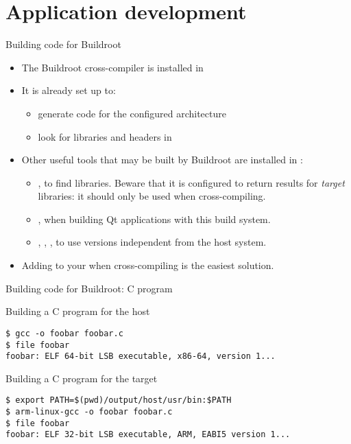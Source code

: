 
\section{Application development}

\begin{frame}{Building code for Buildroot}
  \begin{itemize}
  \item The Buildroot cross-compiler is installed in
  \item It is already set up to:
    \begin{itemize}
    \item generate code for the configured architecture
    \item look for libraries and headers in 
    \end{itemize}
  \item Other useful tools that may be built by Buildroot are
    installed in :
    \begin{itemize}
    \item {}, to find libraries. Beware that it is
      configured to return results for {\em target} libraries: it
      should only be used when cross-compiling.
    \item {}, when building Qt applications with this build
      system.
    \item {}, , , to use
      versions independent from the host system.
    \end{itemize}
  \item Adding  to your  when
    cross-compiling is the easiest solution.
  \end{itemize}
\end{frame}

\begin{frame}[fragile]{Building code for Buildroot: C program}

\begin{block}{Building a C program for the host}
{\small
  \begin{verbatim}
$ gcc -o foobar foobar.c
$ file foobar
foobar: ELF 64-bit LSB executable, x86-64, version 1...
\end{verbatim}}
\end{block}

\begin{block}{Building a C program for the target}
{\small
  \begin{verbatim}
$ export PATH=$(pwd)/output/host/usr/bin:$PATH
$ arm-linux-gcc -o foobar foobar.c
$ file foobar
foobar: ELF 32-bit LSB executable, ARM, EABI5 version 1...
\end{verbatim}}
\end{block}

\end{frame}

